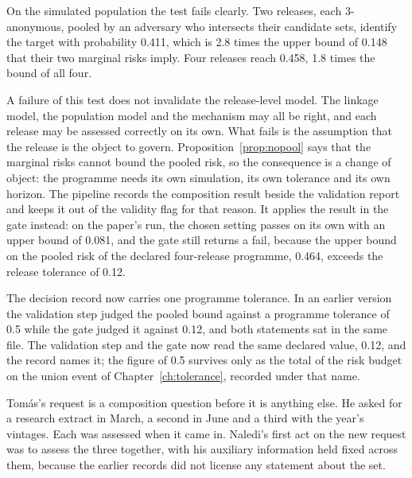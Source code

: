 On the simulated population the test fails clearly. Two releases, each 3-anonymous,
pooled by an adversary who intersects their candidate sets, identify the target with
probability 0.411, which is 2.8 times the upper bound of 0.148 that their two
marginal risks imply. %
Four releases reach 0.458, 1.8 times the bound of all four.

A failure of this test does not invalidate the release-level model. The linkage
model, the population model and the mechanism may all be right, and each release may
be assessed correctly on its own. What fails is the assumption that the release is
the object to govern. Proposition~\ref{prop:nopool} says that the marginal risks
cannot bound the pooled risk, so the consequence is a change of object: the
programme needs its own simulation, its own tolerance and its own horizon. The
pipeline records the composition result beside the validation report and keeps it
out of the validity flag for that reason. %
It applies the result in the gate instead: on the paper's run, the chosen setting
passes on its own with an upper bound of 0.081, and the gate still returns a fail,
because the upper bound on the pooled risk of the declared four-release programme,
0.464, exceeds the release tolerance of 0.12. %

The decision record now carries one programme tolerance. In an earlier version the
validation step judged the pooled bound against a programme tolerance of 0.5 while the gate
judged it against 0.12, and both statements sat in the same file. The validation step and the
gate now read the same declared value, 0.12, and the record names it; the figure of 0.5
survives only as the total of the risk budget on the union event of Chapter~\ref{ch:tolerance},
recorded under that name.

Tomás's request is a composition question before it is anything else. He asked for
a research extract in March, a second in June and a third with the year's vintages.
Each was assessed when it came in. Naledi's first act on the new request was to
assess the three together, with his auxiliary information held fixed across them,
because the earlier records did not license any statement about the set.

